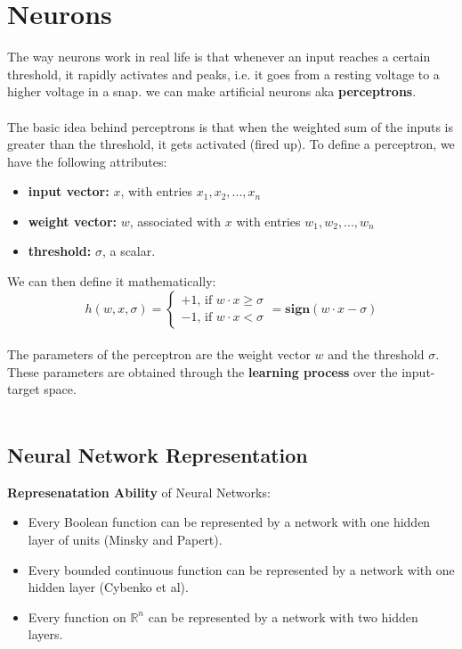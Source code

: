 \documentclass[12pt, a4paper]{book}
\begin{document}
\section{Neurons}
The way neurons work in real life is that whenever an input reaches a certain threshold, it rapidly activates and peaks, i.e. it goes from a resting voltage to a higher voltage in a snap. we can make artificial neurons aka \textbf{perceptrons}.\\\\
The basic idea behind perceptrons is that when the weighted sum of the inputs is greater than the threshold, it gets activated (fired up). To define a perceptron, we have the following attributes:
\begin{itemize}
    \item \textbf{input vector:} $x$, with entries $x_1,x_2,...,x_n$
    \item \textbf{weight vector:} $w$, associated with $x$ with entries $w_1,w_2,...,w_n$
    \item \textbf{threshold:} $\sigma$, a scalar.\\
\end{itemize}
We can then define it mathematically:
$$h(w,x,\sigma) = \begin{cases}
    +1 \text{, if } w\cdot x \geq \sigma\\
    -1 \text{, if } w\cdot x < \sigma 
\end{cases} = \textbf{sign}(w\cdot x - \sigma)$$\\
The parameters of the perceptron are the weight vector $w$ and the threshold $\sigma$. These parameters are obtained through the \textbf{learning process} over the input-target space.\\\\
\subsection{Neural Network Representation}
\textbf{Represenatation Ability} of Neural Networks:
\begin{itemize}
    \item Every Boolean function can be represented by a network with one hidden layer of units (Minsky and Papert). 
    \item Every bounded continuous function can be represented by a network with one hidden layer (Cybenko et al). 
    \item Every function on $\mathbb{R}^n$ can be represented by a network with two hidden layers.
\end{itemize}
\end{document}
